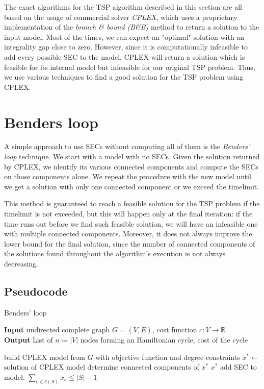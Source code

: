 The exact algorithms for the TSP algorithm described in this section are all based on the usage of commercial solver \textit{CPLEX}, which uses a proprietary implementation of the \textit{branch \& bound (B\&B)} method to return a solution to the input model. Most of the times, we can expect an "optimal" solution with an integrality gap close to zero. However, since it is computationally infeasible to add every possible SEC to the model, CPLEX will return a solution which is feasible for its internal model but infeasible for our original TSP problem. Thus, we use various techniques to find a good solution for the TSP problem using CPLEX.

\section{Benders loop}
A simple approach to use SECs without computing all of them is the \textit{Benders' loop} technique. We start with a model with no SECs. Given the solution returned by CPLEX, we identify its various connected components and compute the SECs on those components alone. We repeat the procedure with the new model until we get a solution with only one connected component or we exceed the timelimit.

This method is guaranteed to reach a feasible solution for the TSP problem if the timelimit is not exceeded, but this will happen only at the final iteration: if the time runs out before we find such feasible solution, we will have an infeasible one with multiple connected components. Moreover, it does not always improve the lower bound for the final solution, since the number of connected components of the solutions found throughout the algorithm's execution is not always decreasing.

\FloatBarrier
\subsection{Pseudocode}
\begin{algorithm}[h]
    \caption{Benders' loop}
    \hspace*{\algorithmicindent} \textbf{Input} undirected complete graph $G=(V,E)$, cost function $c:V\rightarrow\mathbb{R}$\\
    \hspace*{\algorithmicindent} \textbf{Output} List of $n\coloneq|V|$ nodes forming an Hamiltonian cycle, cost of the cycle
    \begin{algorithmic}

        \State build CPLEX model from $G$ with objective function and degree constraints
        \State $x^* \leftarrow$ solution of CPLEX model
        \State determine connected components of $x^*$
        \Return $x^*$
        \EndIf
        \State add SEC to model: $\sum_{e\in\delta(S)}x_e\leq|S|-1$
        \EndFor
        \EndWhile

    \end{algorithmic}
\end{algorithm}
\FloatBarrier

